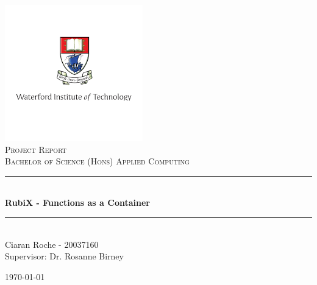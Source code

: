 \begin{titlepage}

\newcommand{\HRule}{\rule{\linewidth}{0.5mm}}

\center

\includegraphics{images/logo.png}\\
\textsc{\Large Project Report}\\[0.5cm]
\textsc{\large Bachelor of Science (Hons) Applied Computing }\\[0.5cm] 


\HRule \\[0.4cm]
{ \huge \bfseries RubiX - Functions as a Container}\\[0.4cm] 
\HRule \\[1.5cm]

\Large Ciaran Roche - 20037160\\[3cm]
\large Supervisor: Dr. Rosanne Birney

{\large \today}\\[1cm]

\vfill 

\end{titlepage}
